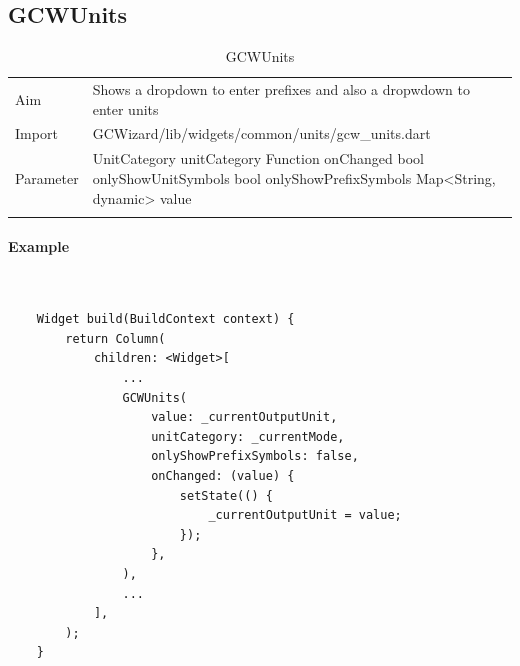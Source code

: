 \subsection{GCWUnits}
\label{fig: GCWUnits}
\begin{table}[H]
    \begin{tabular}[h]{p{2cm}p{9cm}}
        \caption{GCWUnits}
        Aim       & Shows a dropdown to enter prefixes and also a dropwdown to enter units\\
        Import    & GCWizard/lib/widgets/common/units/gcw\_units.dart\\
        Parameter & UnitCategory unitCategory\newline
                    Function onChanged\newline
                    bool onlyShowUnitSymbols\newline
                    bool onlyShowPrefixSymbols\newline
                    Map<String, dynamic> value\\
        \label{tab:GCWUnits}
    \end{tabular}
\end{table}
\paragraph*{Example} \,
\begin{lstlisting}
    Widget build(BuildContext context) {
        return Column(
            children: <Widget>[
                ...
                GCWUnits(
                    value: _currentOutputUnit,
                    unitCategory: _currentMode,
                    onlyShowPrefixSymbols: false,
                    onChanged: (value) {
                        setState(() {
                            _currentOutputUnit = value;
                        });
                    },
                ),
                ...
            ],
        );
    }
\end{lstlisting}
\label{fig: ExampleGCWUnits}

